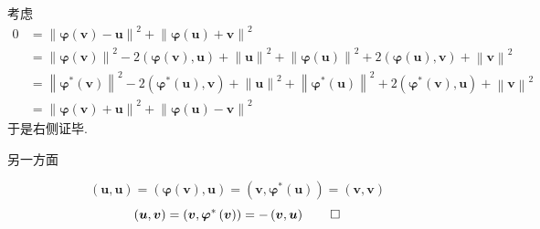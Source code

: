 \begin{green}
\begin{Proof}
        考虑\begin{align*}
            0&=
            \left\lVert\bm{\varphi}\left(\bm{v}\right)-\bm{u}\right\rVert^2+\left\lVert\bm{\varphi}\left(\bm{u}\right)+\bm{v}\right\rVert^2\\
            &=\left\lVert\bm{\varphi}\left(\bm{v}\right)\right\rVert^2-2\left(
                \bm{\varphi}\left(\bm{v}\right),\bm{u}
            \right)+\left\lVert\bm{u}\right\rVert^2+\left\lVert\bm{\varphi}\left(\bm{u}\right)\right\rVert^2+2\left(
                \bm{\varphi}\left(\bm{u}\right),\bm{v}
            \right)+\left\lVert\bm{v}\right\rVert^2\\
            &=\left\lVert\bm{\varphi}^*\left(\bm{v}\right)\right\rVert^2-2\left(
                \bm{\varphi}^*\left(\bm{u}\right),\bm{v}
                \right)+\left\lVert\bm{u}\right\rVert^2+\left\lVert\bm{\varphi}^*\left(\bm{u}\right)\right\rVert^2+2\left(
                    \bm{\varphi}^*\left(\bm{v}\right),\bm{u}
                \right)+\left\lVert\bm{v}\right\rVert^2\\
                &=\left\lVert\bm{\varphi}\left(\bm{v}\right)+\bm{u}\right\rVert^2+\left\lVert\bm{\varphi}\left(\bm{u}\right)-\bm{v}\right\rVert^2
        \end{align*}于是右侧证毕.

        另一方面
        
        \[
        \left(
            \bm{u},\bm{u}
        \right)=\left(
            \bm{\varphi}\left(
                \bm{v}
            \right),\bm{u}
        \right)=\left(
            \bm{v},\bm{\varphi}^*\left(
                \bm{u}
            \right)
        \right)=\left(
            \bm{v},\bm{v}
        \right)
        \]\[
        \left(
           \bm{u},\bm{v}
        \right)=\left(
            \bm{v},\bm{\varphi}^*\left(
                \bm{v}
                \right)
        \right)=-\left(
            \bm{v},\bm{u}
        \right)\qedhere
        \]
    \end{Proof}
\end{green}
